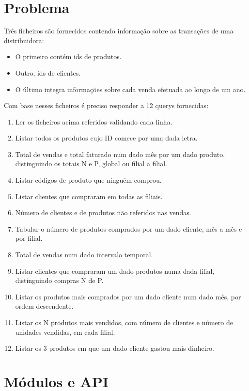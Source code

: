\documentclass[a4paper]{report}
\begin{document}
\chapter{Problema}
Três ficheiros são fornecidos contendo informação sobre as transações de uma distribuidora:
\begin{itemize}
    \item O primeiro contém ids de produtos.
    \item Outro, ids de clientes.
    \item O último integra informações sobre cada venda efetuada ao longo de um ano. 
\end{itemize}
Com base nesses ficheiros é preciso responder a 12 querys fornecidas:
\begin{enumerate}
    \item Ler os ficheiros acima referidos validando cada linha.
    \item Listar todos os produtos cujo ID comece por uma dada letra.
    \item Total de vendas e total faturado num dado mês por um dado produto, distinguindo os totais N e P, global ou filial a filial.
    \item Listar códigos de produto que ninguém comprou.
    \item Listar clientes que compraram em todas as filiais.
    \item Número de clientes e de produtos não referidos nas vendas.
    \item Tabular o número de produtos comprados por um dado cliente, mês a mês e por filial.
    \item Total de vendas num dado intervalo temporal.
    \item Listar clientes que compraram um dado produtos numa dada filial, distinguindo compras N de P.
    \item Listar os produtos mais comprados por um dado cliente num dado mês, por ordem descendente.
    \item Listar os N produtos mais vendidos, com número de clientes e número de unidades vendidas, em cada filial. 
    \item Listar os 3 produtos em que um dado cliente gastou mais dinheiro.
\end{enumerate}

\chapter{Módulos e API}\label{chap:api}
\end{document}
